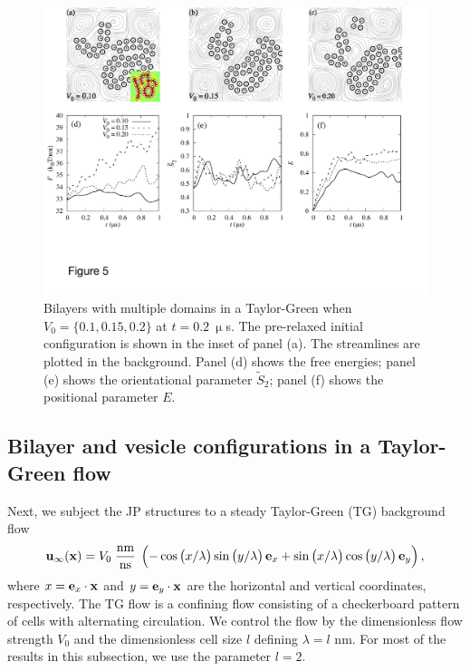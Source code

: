 \documentclass[prb,preprint,showpacs,preprintnumbers,amsmath,amssymb,longbibliography]{revtex4-1}
\newcommand{\xx}{\mathbf{x}}
\newcommand{\uu}{\mathbf{u}}
\begin{document}
%
\begin{figure}
  \begin{center}
    \includegraphics[width=1.0\textwidth]{Figures/Figure5.pdf}    
  \end{center}
  \vspace{-20pt}  
  \caption{\label{fig:BC1_TG} Bilayers with multiple domains in a
  Taylor-Green when $V_0 = \{0.1, 0.15, 0.2\}$ at $t=0.2\ \upmu$s. The
  pre-relaxed initial configuration is shown in the inset of panel (a).
  The streamlines are plotted in the background. Panel (d) shows the
  free energies; panel (e) shows the orientational parameter
  $\tilde{S}_2$; panel (f) shows the positional parameter $E$.}
\end{figure}
%
\subsection{Bilayer and vesicle configurations in a Taylor-Green flow}
Next, we subject the JP structures to a steady Taylor-Green (TG) background
flow
\begin{equation}
\label{eq:tg_flow}
\uu_\infty(\xx) = V_0\; \frac{\text{nm}}{\text{ns}}\;
\left(
-\cos\left(x/\lambda\right)
 \sin\left(y/\lambda\right)
         {\bf e}_x
         +\sin\left(x/\lambda\right)
         \cos\left(y/\lambda\right)
             {\bf e}_y\right),
\end{equation}
where $x = {\bf e}_x \cdot \xx$ and $y = {\bf e}_y \cdot \xx$
are the horizontal and vertical coordinates, respectively. 
The TG flow is a confining flow consisting of a checkerboard pattern
of cells with alternating circulation. We control the flow by the
dimensionless flow strength $V_0$ and the dimensionless cell size $l$
defining $\lambda = l$ nm. For most of the results in this subsection,
we use the parameter $l=2$.
%
\end{document}
